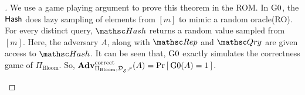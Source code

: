 \begin{proof}[]
We use a game playing argument to prove this theorem in the ROM. In $\text{G0}$, the $\mathsf{Hash}$ does lazy sampling of elements from $[m]$ to mimic a random oracle(RO). For every distinct query, $\Hash$ returns a random value sampled from $[m]$. Here, the adversary $A$, along with $\Rep$ and $\Qry$ are given access to $\Hash$. It can be seen that, $\text{G0}$ exactly simulates the correctness game of $\Pi_{\mathrm{Bloom}}$. So, $\mathrm{\mathbf{Adv}}^{\mathrm{correct}}_{\Pi_{\mathrm{Bloom}},\mathcal{D}_{{\cal S}}^{},r}(A) = \Pr\left[\: \text{G0}(A) = 1 \:\right]$.

\begin{figure}
\end{figure}
\end{proof}
